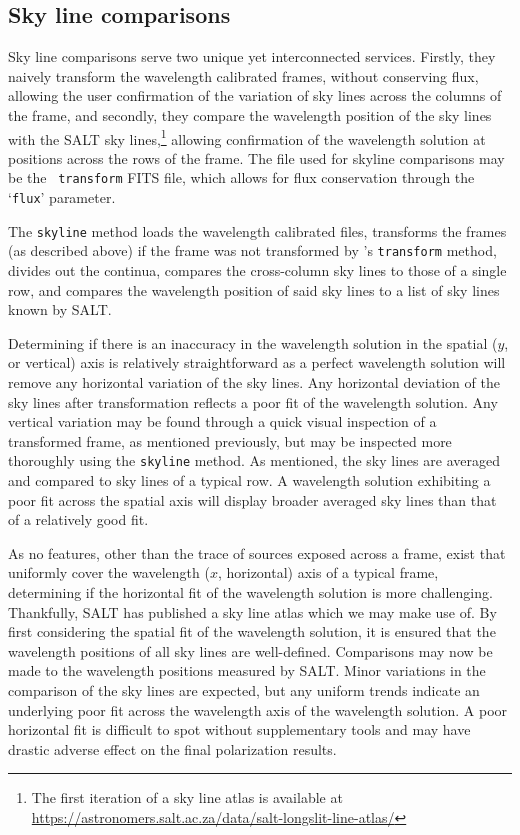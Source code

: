 \subsection{Sky line comparisons}\label{subsec:skyline_discuss}

\prgph

Sky line comparisons serve two unique yet interconnected services. Firstly, they naively transform the wavelength calibrated frames, without conserving flux, allowing the user confirmation of the variation of sky lines across the columns of the frame, and secondly, they compare the wavelength position of the sky lines with the \gls{SALT} sky lines,\footnote{The first iteration of a sky line atlas is available at \url{https://astronomers.salt.ac.za/data/salt-longslit-line-atlas/}} allowing confirmation of the wavelength solution at positions across the rows of the frame. The file used for skyline comparisons may be the \iraf\ \texttt{transform} \gls{FITS} file, which allows for flux conservation through the `\texttt{flux}' parameter.
\prgph

The \texttt{skyline} method loads the wavelength calibrated files, transforms the frames (as described above) if the frame was not transformed by \iraf's \texttt{transform} method, divides out the continua, compares the cross-column sky lines to those of a single row, and compares the wavelength position of said sky lines to a list of sky lines known by \gls{SALT}.

Determining if there is an inaccuracy in the wavelength solution in the spatial ($y$, or vertical) axis is relatively straightforward as a perfect wavelength solution will remove any horizontal variation of the sky lines. Any horizontal deviation of the sky lines after transformation reflects a poor fit of the wavelength solution. Any vertical variation may be found through a quick visual inspection of a transformed frame, as mentioned previously, but may be inspected more thoroughly using the \texttt{skyline} method. As mentioned, the sky lines are averaged and compared to sky lines of a typical row. A wavelength solution exhibiting a poor fit across the spatial axis will display broader averaged sky lines than that of a relatively good fit.
\prgph

As no features, other than the trace of sources exposed across a frame, exist that uniformly cover the wavelength ($x$, horizontal) axis of a typical frame, determining if the horizontal fit of the wavelength solution is more challenging. Thankfully, \gls{SALT} has published a sky line atlas which we may make use of. By first considering the spatial fit of the wavelength solution, it is ensured that the wavelength positions of all sky lines are well-defined. Comparisons may now be made to the wavelength positions measured by \gls{SALT}. Minor variations in the comparison of the sky lines are expected, but any uniform trends indicate an underlying poor fit across the wavelength axis of the wavelength solution. A poor horizontal fit is difficult to spot without supplementary tools and may have drastic adverse effect on the final polarization results.


